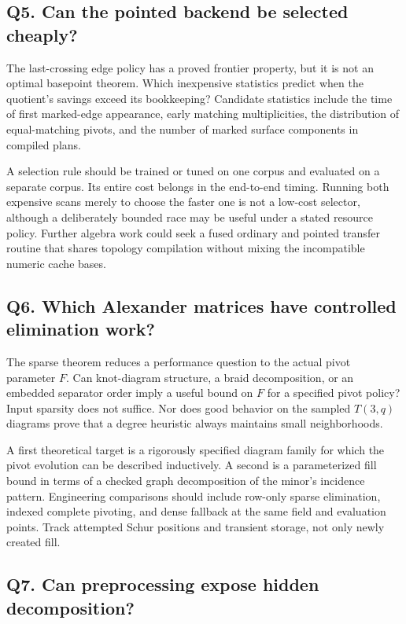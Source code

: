 \subsection{Q5. Can the pointed backend be selected cheaply?}

The last-crossing edge policy has a proved frontier property, but it is not
an optimal basepoint theorem.  Which inexpensive statistics predict when
the quotient's savings exceed its bookkeeping?  Candidate statistics include
the time of first marked-edge appearance, early matching multiplicities,
the distribution of equal-matching pivots, and the number of marked surface
components in compiled plans.

A selection rule should be trained or tuned on one corpus and evaluated on
a separate corpus.  Its entire cost belongs in the end-to-end timing.
Running both expensive scans merely to choose the faster one is not a
low-cost selector, although a deliberately bounded race may be useful under
a stated resource policy.  Further algebra work could seek a fused ordinary
and pointed transfer routine that shares topology compilation without mixing
the incompatible numeric cache bases.

\subsection{Q6. Which Alexander matrices have controlled elimination work?}

The sparse theorem reduces a performance question to the actual pivot
parameter $F$.  Can knot-diagram structure, a braid decomposition, or an
embedded separator order imply a useful bound on $F$ for a specified pivot
policy?  Input sparsity does not suffice.  Nor does good behavior on the
sampled $T(3,q)$ diagrams prove that a degree heuristic always maintains
small neighborhoods.

A first theoretical target is a rigorously specified diagram family for
which the pivot evolution can be described inductively.  A second is a
parameterized fill bound in terms of a checked graph decomposition of the
minor's incidence pattern.  Engineering comparisons should include row-only
sparse elimination, indexed complete pivoting, and dense fallback at the
same field and evaluation points.  Track attempted Schur positions and
transient storage, not only newly created fill.

\subsection{Q7. Can preprocessing expose hidden decomposition?}

